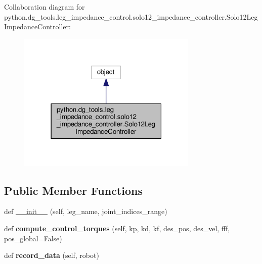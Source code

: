 Collaboration diagram for python.\+dg\+\_\+tools.\+leg\+\_\+impedance\+\_\+control.\+solo12\+\_\+impedance\+\_\+controller.\+Solo12\+Leg\+Impedance\+Controller\+:
\nopagebreak
\begin{figure}[H]
\begin{center}
\leavevmode
\includegraphics[width=243pt]{classpython_1_1dg__tools_1_1leg__impedance__control_1_1solo12__impedance__controller_1_1Solo12Le6bc9863ffab3fd8e5fa078bb855c3c90}
\end{center}
\end{figure}
\subsection*{Public Member Functions}
\begin{DoxyCompactItemize}
\item 
def \hyperlink{classpython_1_1dg__tools_1_1leg__impedance__control_1_1solo12__impedance__controller_1_1Solo12LegImpedanceController_aa956e758651721d07585b2c1d6f197c7}{\+\_\+\+\_\+init\+\_\+\+\_\+} (self, leg\+\_\+name, joint\+\_\+indices\+\_\+range)
\item 
def {\bfseries compute\+\_\+control\+\_\+torques} (self, kp, kd, kf, des\+\_\+pos, des\+\_\+vel, fff, pos\+\_\+global=False)\hypertarget{classpython_1_1dg__tools_1_1leg__impedance__control_1_1solo12__impedance__controller_1_1Solo12LegImpedanceController_a50833108bac36327c6971e15f4ae8ff5}{}\label{classpython_1_1dg__tools_1_1leg__impedance__control_1_1solo12__impedance__controller_1_1Solo12LegImpedanceController_a50833108bac36327c6971e15f4ae8ff5}

\item 
def {\bfseries record\+\_\+data} (self, robot)\hypertarget{classpython_1_1dg__tools_1_1leg__impedance__control_1_1solo12__impedance__controller_1_1Solo12LegImpedanceController_a4ccf4791677cb4b38c1bd2470f2c1ed4}{}\label{classpython_1_1dg__tools_1_1leg__impedance__control_1_1solo12__impedance__controller_1_1Solo12LegImpedanceController_a4ccf4791677cb4b38c1bd2470f2c1ed4}

\end{DoxyCompactItemize}
